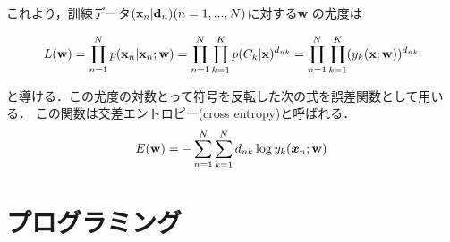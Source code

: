 \documentclass[a4paper,10pt]{jsarticle}
\def\vec#1{\mbox{\boldmath$#1$}}
\begin{document}
これより，訓練データ${({\bf x}_n|{\bf d}_n)}(n=1,...,N)$に対する{\bf w}
の尤度は

\begin{equation}
 L({\bf w})=\prod_{n=1}^{N}p({\bf x}_n|{\bf x}_n;{\bf
	w})=\prod_{n=1}^{N}\prod_{k=1}^{K}p(C_k|{\bf
	x})^{d_{nk}}=\prod_{n=1}^{N}\prod_{k=1}^{K}(y_k({\bf x};{\bf w}))^{d_{nk}}
\end{equation}

と導ける．この尤度の対数とって符号を反転した次の式を誤差関数として用いる．
この関数は交差エントロピー(cross entropy)と呼ばれる．
\begin{eqnarray}
 E({\bf w})=-\sum^{N}_{n=1}\sum^{N}_{k=1}d_{nk}\log
	y_{k}(\vec{x}_{n};{\bf w})
\end{eqnarray}


\section{プログラミング}
\end{document}
